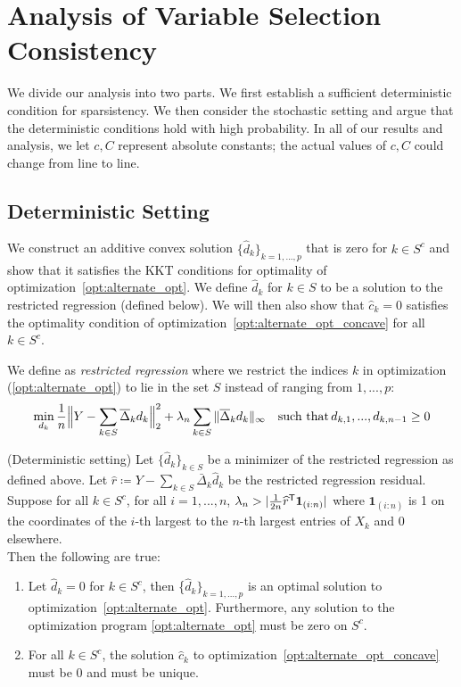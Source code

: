 \section{Analysis of Variable Selection Consistency}

We divide our analysis into two parts. We first establish a sufficient deterministic condition for sparsistency.  We then consider the
stochastic setting and argue that the deterministic conditions hold with high probability. In all of our results and analysis, we let $c, C$ represent absolute constants; the actual values of $c,C$ could change from line to line.

\subsection{Deterministic Setting}

We construct an additive convex solution $\{\hat{d}_k\}_{k=1,...,p}$ that is zero for $k \in S^c$ and show that it satisfies the KKT conditions for optimality of optimization~\ref{opt:alternate_opt}. We define $\hat{d}_k$ for $k \in S$ to be a solution to the restricted regression (defined below). We will then also show that $\hat{c}_k = 0$ satisfies the optimality condition of optimization~\ref{opt:alternate_opt_concave} for all $k \in S^c$.

\begin{definition}
\label{def:restricted_regression}
We define as \emph{restricted regression} where we restrict the indices $k$ in
optimization (\ref{opt:alternate_opt}) to lie in the set $S$ instead of ranging from $1,...,p$:
\[
\min_{d_k} \frac{1}{n} \Big\| Y - \sum_{k \in S} \overline{\Delta}_k d_k \Big\|_2^2 + 
   \lambda_n \sum_{k \in S} \| \overline{\Delta}_k d_k \|_\infty \quad \textrm{such that} \, d_{k,1}, ..., d_{k,n-1} \geq 0
\]
\end{definition}

\begin{theorem} (Deterministic setting)
\label{thm:deterministic}
Let $\{\hat{d}_k \}_{k \in S}$ be a minimizer of the restricted regression as defined above.
Let $\hat{r} \coloneqq Y - \sum_{k \in S} \bar{\Delta}_k \hat{d}_k$ be the restricted regression residual. \\

Suppose for all $k\in S^c$, for all $i=1,...,n$, $\lambda_n > | \frac{1}{2n}
\widehat{r}^{\mathsf{T}} \mbox{\boldmath $1$}_{(i:n)}|$ where $\mathbf{1}_{(i:n)}$ is 1 on the coordinates of the $i$-th largest to the $n$-th largest entries of $X_k$ and 0 elsewhere.\\

Then the following are true:
\begin{enumerate}
\item Let $\hat{d}_k = 0$ for $k \in S^c$, then \{$\hat{d}_k\}_{k=1,...,p}$ is an optimal solution to optimization~\ref{opt:alternate_opt}. Furthermore, any solution to the optimization program \ref{opt:alternate_opt} must be zero on $S^c$.
\item For all $k \in S^c$, the solution $\hat{c}_k$ to optimization~\ref{opt:alternate_opt_concave} must be 0 and must be unique.
\end{enumerate}

\end{theorem}

